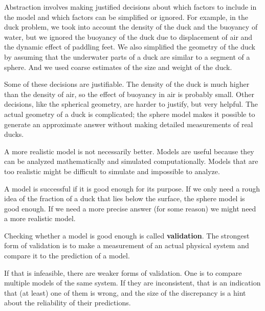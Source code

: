 \documentclass[
]{book}
\begin{document}
Abstraction involves making justified decisions about which factors to
include in the model and which factors can be simplified or ignored.
For example, in the duck problem, we took into account the density of
the duck and the buoyancy of water, but we ignored the buoyancy of the
duck due to displacement of air and the dynamic effect of paddling
feet.  We also simplified the geometry of the duck by assuming that
the underwater parts of a duck are similar to a segment of a sphere.
And we used coarse estimates of the size and weight of the duck.

Some of these decisions are justifiable.  The density of the duck
is much higher than the density of air, so the effect of buoyancy
in air is probably small.  Other decisions, like the spherical
geometry, are harder to justify, but very helpful.  The actual
geometry of a duck is complicated; the sphere model makes it possible
to generate an approximate answer without making detailed measurements
of real ducks.

A more realistic model is not necessarily better.  Models are useful
because they can be analyzed mathematically and simulated
computationally.  Models that are too realistic might be difficult to
simulate and impossible to analyze.

A model is successful if it is good enough for its purpose.  If we
only need a rough idea of the fraction of a duck that lies below
the surface, the sphere model is good enough.  If we need a more
precise answer (for some reason) we might need a more realistic
model.



Checking whether a model is good enough is called {\bf validation}.
The strongest form of validation is to make a measurement of an
actual physical system and compare it to the prediction of a
model.

If that is infeasible, there are weaker forms of validation.  One is
to compare multiple models of the same system.  If they are
inconsistent, that is an indication that (at least) one of them is
wrong, and the size of the discrepancy is a hint about the reliability
of their predictions.
\end{document}
